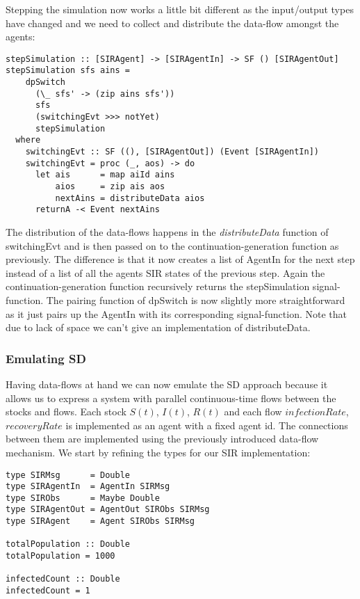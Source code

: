 Stepping the simulation now works a little bit different as the input/output types have changed and we need to collect and distribute the data-flow amongst the agents:

\begin{verbatim}
stepSimulation :: [SIRAgent] -> [SIRAgentIn] -> SF () [SIRAgentOut]
stepSimulation sfs ains =
    dpSwitch
      (\_ sfs' -> (zip ains sfs'))
      sfs
      (switchingEvt >>> notYet)
      stepSimulation
  where
    switchingEvt :: SF ((), [SIRAgentOut]) (Event [SIRAgentIn])
    switchingEvt = proc (_, aos) -> do
      let ais      = map aiId ains
          aios     = zip ais aos
          nextAins = distributeData aios
      returnA -< Event nextAins
\end{verbatim}

The distribution of the data-flows happens in the \textit{distributeData} function of switchingEvt and is then passed on to the continuation-generation function as previously. The difference is that it now creates a list of AgentIn for the next step instead of a list of all the agents SIR states of the previous step. Again the continuation-generation function recursively returns the stepSimulation signal-function. The pairing function of dpSwitch is now slightly more straightforward as it just pairs up the AgentIn with its corresponding signal-function. Note that due to lack of space we can't give an implementation of distributeData.

\subsubsection{Emulating SD}
Having data-flows at hand we can now emulate the SD approach because it allows us to express a system with parallel continuous-time flows between the stocks and flows. Each stock $S(t)$, $I(t)$, $R(t)$ and each flow $infectionRate$, $recoveryRate$ is implemented as an agent with a fixed agent id. The connections between them are implemented using the previously introduced data-flow mechanism. We start by refining the types for our SIR implementation:

\begin{verbatim}
type SIRMsg      = Double
type SIRAgentIn  = AgentIn SIRMsg
type SIRObs      = Maybe Double
type SIRAgentOut = AgentOut SIRObs SIRMsg
type SIRAgent    = Agent SIRObs SIRMsg

totalPopulation :: Double
totalPopulation = 1000

infectedCount :: Double
infectedCount = 1
\end{verbatim}

